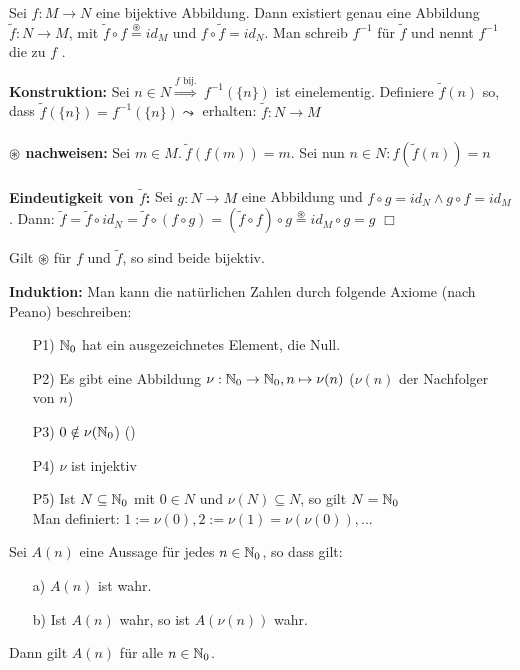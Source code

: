 \begin{satz}
	Sei $f:M\rightarrow N$ eine bijektive Abbildung. Dann existiert genau eine Abbildung $\tilde{f}:N\rightarrow M$, mit $\tilde{f}\circ f \stackrel{\circledast}{=} id_{M}$ und $f\circ\tilde{f}=id_{N}$. Man schreib $f^{-1}$ für $\tilde{f}$ und nennt $f^{-1}$ die zu $f$ .
\end{satz}

\begin{bew}
	\textbf{Konstruktion:} Sei $n\in N\stackrel{f\text{ bij.}}{\Rightarrow}\:f^{-1}(\{n\})$ ist einelementig. Definiere $\tilde{f}(n)$ so, dass $\tilde{f}(\{n\})=f^{-1}(\{n\}) \leadsto$ erhalten: $\tilde{f}:N\rightarrow M$\\
	\\
	\textbf{$\circledast$ nachweisen:} Sei $m\in M.\:\tilde{f}(f(m))=m$. Sei nun $n\in N:f(\tilde{f}(n))=n$\\
	\\
	\textbf{Eindeutigkeit von $\tilde{f}$:} Sei $g:N\rightarrow M$ eine Abbildung und $f\circ g=id_{N}\wedge g\circ f=id_{M}$. Dann: $\tilde{f}=\tilde{f}\circ id_{N}=\tilde{f}\circ(f\circ g)=(\tilde{f}\circ f)\circ g \stackrel{\circledast}{=} id_{M}\circ g=g$ \hfill $\Box$
\end{bew}

\begin{bem}
	Gilt $\circledast$ für $f$ und $\tilde{f}$, so sind beide bijektiv.
\end{bem}

\noindent \textbf{Induktion:} Man kann die natürlichen Zahlen durch folgende Axiome (nach Peano) beschreiben:
\begin{itemize}
	\item[P1)] $\mathbb{N}_{0}$ hat ein ausgezeichnetes Element, die Null.
	\item[P2)] Es gibt eine Abbildung $\nu:\mathbb{N}_{0}\rightarrow\mathbb{N}_{0},n\mapsto\nu(n)$ ($\nu(n)$ der Nachfolger von $n$)
	\item[P3)] $0\notin\nu(\mathbb{N}_{0}$) ()
	\item[P4)] $\nu$ ist injektiv
	\item[P5)] Ist $N\subseteq\mathbb{N}_{0}$ mit $0\in N$ und $\nu(N)\subseteq N$, so gilt $N=\mathbb{N}_{0}$\\
	Man definiert: $1:=\nu(0), 2:=\nu(1)=\nu(\nu(0)),...$
\end{itemize}

\begin{satz}[Induktionsprinzip]
	Sei $A(n)$ eine Aussage für jedes $n\in\mathbb{N}_{0}$, so dass gilt:
	\begin{itemize}
		\item[a)] $A(n)$ ist wahr.
		\item[b)] Ist $A(n)$ wahr, so ist $A(\nu(n))$ wahr.
	\end{itemize}
	Dann gilt $A(n)$ für alle $n\in\mathbb{N}_{0}$.
\end{satz}

